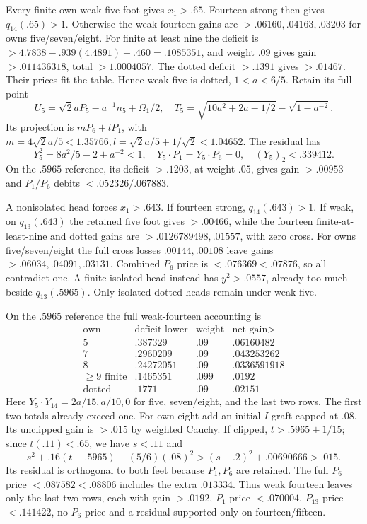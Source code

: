 \documentclass[11pt]{article}
\theoremstyle{definition}
\theoremstyle{remark}
\begin{document}
Every finite-own weak-five foot gives \(x_1>.65\). Fourteen strong
then gives \(q_{14}(.65)>1\). Otherwise the weak-fourteen gains
are \(>.06160,.04163,.03203\) for owns five/seven/eight. For finite
at least nine the deficit is
\(>4.7838-.939(4.4891)-.460=.1085351\), and weight \(.09\)
gives gain \(>.011436318\), total \(>1.0004057\). The dotted
deficit \(>.1391\) gives \(>.01467\). Their prices fit the table.
Hence weak five is dotted, \(1<a<6/5\). Retain its full point
\[
 U_5=\sqrt2aP_5-a^{-1}n_5+\Omega_1/2,\quad
 T_5=\sqrt{10a^2+2a-1/2}-\sqrt{1-a^{-2}}.
\]
Its projection is \(mP_6+lP_1\), with
\(m=4\sqrt2a/5<1.35766,l=\sqrt2a/5+1/\sqrt2<1.04652\).
The residual has
\[
 Y_5^2=8a^2/5-2+a^{-2}<1,\quad Y_5\cdot P_1=Y_5\cdot P_6=0,
 \quad(Y_5)_2<.339412.
\]
On the \(.5965\) reference, its deficit \(>.1203\), at weight
\(.05\), gives gain \(>.00953\) and \(P_1/P_6\) debits
\(<.052326/.067883\).

A nonisolated head forces \(x_1>.643\). If fourteen strong,
\(q_{14}(.643)>1\). If weak, on \(q_{13}(.643)\) the retained
five foot gives \(>.00466\), while the fourteen finite-at-least-nine
and dotted gains are \(>.0126789498,.01557\), with zero cross.
For owns five/seven/eight the full cross losses \(.00144,.00108\)
leave gains \(>.06034,.04091,.03131\). Combined \(P_6\) price
is \(<.076369<.07876\), so all contradict one. A finite isolated
head instead has \(y^2>.0557\), already too much beside
\(q_{13}(.5965)\). Only isolated dotted heads remain under weak five.

On the \(.5965\) reference the full weak-fourteen accounting is
\[
\begin{array}{c|c|c|c}
\text{own}&\text{deficit lower}&\text{weight}&\text{net gain}>\\\hline
5&.387329&.09&.06160482\\7&.2960209&.09&.043253262\\
8&.24272051&.09&.0336591918\\
\ge9\text{ finite}&.1465351&.099&.0192\\
\text{dotted}&.1771&.09&.02151
\end{array}
\]
Here \(Y_5\cdot Y_{14}=2a/15,a/10,0\) for five, seven/eight,
and the last two rows. The first two totals already exceed one.
For own eight add an initial-\(I\) graft capped at \(.08\).
Its unclipped gain is \(>.015\) by weighted Cauchy. If clipped,
\(t>.5965+1/15\); since \(t(.11)<.65\), we have \(s<.11\) and
\[
 s^2+.16(t-.5965)-(5/6)(.08)^2
 >(s-.2)^2+.00690666>.015.
\]
Its residual is orthogonal to both feet because \(P_1,P_6\) are
retained. The full \(P_6\) price \(<.087582<.08806\) includes
the extra \(.013334\). Thus weak fourteen leaves only the last two
rows, each with gain \(>.0192\), \(P_1\) price \(<.070004\),
\(P_{13}\) price \(<.141422\), no \(P_6\) price and a residual
supported only on fourteen/fifteen.
\end{document}
